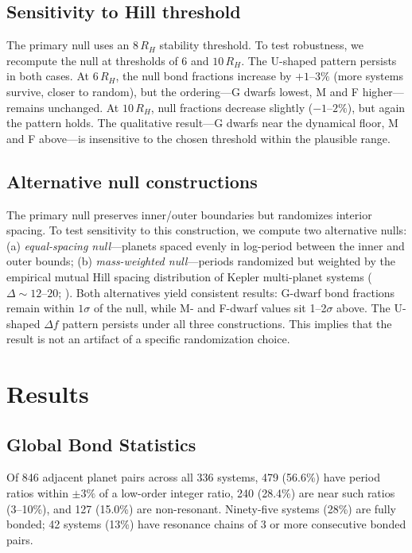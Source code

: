 \documentclass[twocolumn,usenatbib]{mnras}
\begin{document}
\subsection{Sensitivity to Hill threshold}
\label{sec:hill_threshold}
The primary null uses an $8\,R_H$ stability threshold. To test robustness, we
recompute the null at thresholds of 6 and $10\,R_H$. The U-shaped pattern
persists in both cases. At $6\,R_H$, the null bond fractions increase by
$+1$--$3\%$ (more systems survive, closer to random), but the ordering---G
dwarfs lowest, M and F higher---remains unchanged. At $10\,R_H$, null fractions
decrease slightly ($-1$--$2\%$), but again the pattern holds. The qualitative
result---G dwarfs near the dynamical floor, M and F above---is insensitive to
the chosen threshold within the plausible range.

\subsection{Alternative null constructions}
\label{sec:null_robustness}
The primary null preserves inner/outer boundaries but randomizes interior
spacing. To test sensitivity to this construction, we compute two alternative
nulls: (a) \textit{equal-spacing null}---planets spaced evenly in log-period
between the inner and outer bounds; (b) \textit{mass-weighted null}---periods
randomized but weighted by the empirical mutual Hill spacing distribution of
Kepler multi-planet systems ($\Delta \sim 12$--$20$;
\citet{puwu2015}). Both alternatives yield consistent results: G-dwarf bond
fractions remain within $1\sigma$ of the null, while M- and F-dwarf values sit
1--2$\sigma$ above. The U-shaped $\Delta f$ pattern persists under all three
constructions. This implies that the result is not an artifact of a specific
randomization choice.

\section{Results}
\label{sec:results}

\subsection{Global Bond Statistics}

Of 846 adjacent planet pairs across all 336 systems, 479 (56.6\%) have period
ratios within $\pm 3\%$ of a low-order integer ratio, 240 (28.4\%) are near
such ratios (3--10\%), and 127 (15.0\%) are non-resonant. Ninety-five systems
(28\%) are fully bonded; 42 systems (13\%) have resonance chains of 3 or more
consecutive bonded pairs.
\end{document}
